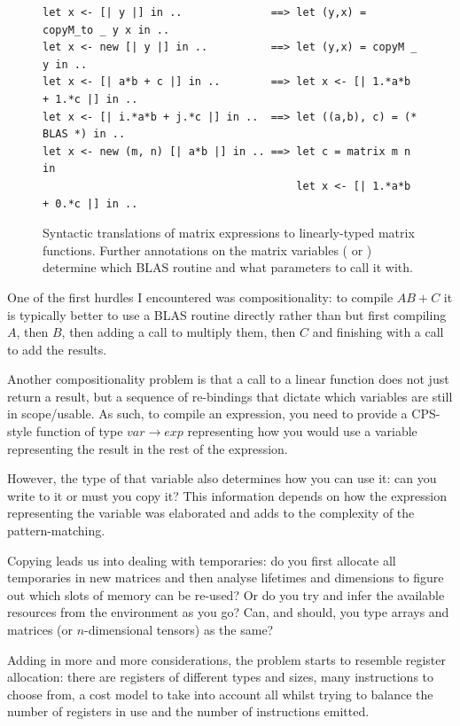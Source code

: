 \begin{figure}[tp]
    \begin{verbatim}
let x <- [| y |] in ..              ==> let (y,x) = copyM_to _ y x in ..
let x <- new [| y |] in ..          ==> let (y,x) = copyM _ y in ..
let x <- [| a*b + c |] in ..        ==> let x <- [| 1.*a*b + 1.*c |] in ..
let x <- [| i.*a*b + j.*c |] in ..  ==> let ((a,b), c) = (* BLAS *) in ..
let x <- new (m, n) [| a*b |] in .. ==> let c = matrix m n in
                                        let x <- [| 1.*a*b + 0.*c |] in ..
    \end{verbatim}
    \caption{Syntactic translations of matrix expressions to linearly-typed
        matrix functions. Further annotations on the matrix variables
        ( or ) determine which BLAS routine and what
        parameters to call it with.}\label{fig:mat_patterns}

\end{figure}

One of the first hurdles I encountered was compositionality: to compile $AB +
C$ it is typically better to use a BLAS routine directly rather than but first
compiling $A$, then $B$, then adding a call to multiply them, then $C$ and
finishing with a call to add the results.

Another compositionality problem is that a call to a linear function does not
just return a result, but a sequence of re-bindings that dictate which
variables are still in scope/usable.  As such, to compile an expression, you
need to provide a CPS-style function of type $var \rightarrow exp$ representing
how you would use a variable representing the result in the rest of the
expression.

However, the type of that variable also determines how you can use it: can you
write to it or must you copy it? This information depends on how the expression
representing the variable was elaborated and adds to the complexity of the
pattern-matching.

Copying leads us into dealing with temporaries: do you first allocate all
temporaries in new matrices and then analyse lifetimes and dimensions to figure
out which slots of memory can be re-used? Or do you try and infer the available
resources from the environment as you go?  Can, and should, you type arrays and
matrices (or $n$-dimensional tensors) as the same?

Adding in more and more considerations, the problem starts to resemble register
allocation: there are registers of different types and sizes, many instructions
to choose from, a cost model to take into account all whilst trying to balance
the number of registers in use and the number of instructions emitted.

